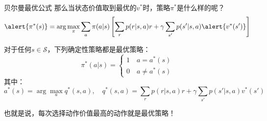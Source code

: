 \begin{frame}{贝尔曼最优公式}
    那么当状态价值取到最优的$v^*$时，策略$\pi^*$是什么样的呢？
    \[
        \alert{\pi^*(s)}=\arg\underset{\pi}{\max}\sum_a\pi(a|s)\left[\sum_r p(r|s,a)r+\gamma\sum_{s'}p(s'|s,a)\alert{v^*(s')}\right]
    \]
    \begin{theorem}
        对于任何$s\in \mathcal{S}$，下列确定性策略都是最优策略：
        \[
            \pi^*(a|s)=
            \begin{cases}
                1 \quad a=a^*(s) \\
                0 \quad a\neq a^*(s)
            \end{cases}
        \]
        其中：
        \[
                a^*(s)=\arg\underset{a}{\max} q^*(s,a),\quad
                q^*(s,a)=\sum_r p(r|s,a)r+\gamma\sum_{s'}p(s'|s,a)v^*(s')
        \]
    \end{theorem}

    也就是说，\alert{每次选择动作价值最高的动作就是最优策略！}
\end{frame}

